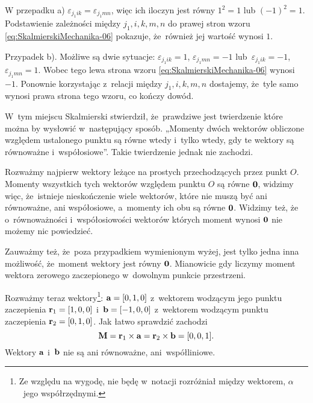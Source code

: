 \documentclass[a4paper,11pt]{article}
\begin{document}
W przepadku a) $\varepsilon_{ j_{ 1 } i k } = \varepsilon_{ j_{ 1 } m n }$, więc ich iloczyn jest
równy $1^{ 2 } = 1$ lub $( -1 )^{ 2 } = 1$. Podstawienie zależności między
$j_{ 1 }, i, k, m, n$ do prawej stron wzoru
\eqref{eq:SkalmierskiMechanika-06} pokazuje, że~również jej wartość wynosi
$1$.

Przypadek b). Możliwe są dwie sytuacje:
$\varepsilon_{ j_{ 1 } i k } = 1$, $\varepsilon_{ j_{ 1 } m n } = -1$
lub~$\varepsilon_{ j_{ 1 } i k } = -1$, $\varepsilon_{ j_{ 1 } m n } = 1$. Wobec tego lewa strona wzoru
\eqref{eq:SkalmierskiMechanika-06} wynosi $-1$. Ponownie korzystając
z~relacji między $j_{ 1 }, i, k, m, n$ dostajemy, że~tyle samo wynosi prawa
strona tego wzoru, co kończy dowód.

\vspace{\spaceFour}





\noindent
{} W~tym miejscu Skalmierski stwierdził, że~prawdziwe jest twierdzenie
które można by wysłowić w~następujący sposób. „Momenty dwóch wektorów
obliczone względem ustalonego punktu są równe wtedy i~tylko wtedy, gdy te
wektory są równoważne i~współosiowe”. Takie twierdzenie jednak nie zachodzi.

Rozważmy najpierw wektory leżące na prostych przechodzących przez punkt
$O$. Momenty wszystkich tych wektorów względem punktu $O$ są równe
$\mathbf{0}$, widzimy więc, że~istnieje nieskończenie wiele wektorów,
które nie muszą być ani równoważne, ani współosiowe, a~momenty ich obu są
równe $\mathbf{0}$. Widzimy też, że o~równoważności i~współosiowości
wektorów których moment wynosi $\mathbf{0}$ nie możemy nic powiedzieć.

Zauważmy też, że~poza przypadkiem wymienionym wyżej, jest tylko jedna inna
możliwość, że~moment wektory jest równy $\mathbf{0}$. Mianowicie gdy
liczymy moment wektora zerowego zaczepionego w~dowolnym punkcie
przestrzeni.

Rozważmy teraz wektory\footnote{Ze względu na wygodę, nie będę w~notacji
  rozróżniał między wektorem, $\alpha$~jego współrzędnymi.}:
$\mathbf{a} = [ 0, 1, 0 ]$ z~wektorem wodzącym jego punktu zaczepienia
$\mathbf{r}_{ 1 } = [ 1, 0, 0 ]$ i~$\mathbf{b} = [ -1, 0,  0 ]$ z~wektorem
wodzącym punktu zaczepienia $\mathbf{r}_{ 2 } = [ 0, 1, 0 ]$. Jak łatwo
sprawdzić zachodzi
\begin{equation}
  \label{eq:SkalmierskiMechanika-07}
  \mathbf{M} = \mathbf{r}_{ 1 } \times \mathbf{a} =
  \mathbf{r}_{ 2 } \times \mathbf{b} = [ 0, 0, 1 ].
\end{equation}
Wektory $\mathbf{a}$ i~$\mathbf{b}$ nie są ani równoważne, ani~współliniowe.
\end{document}
